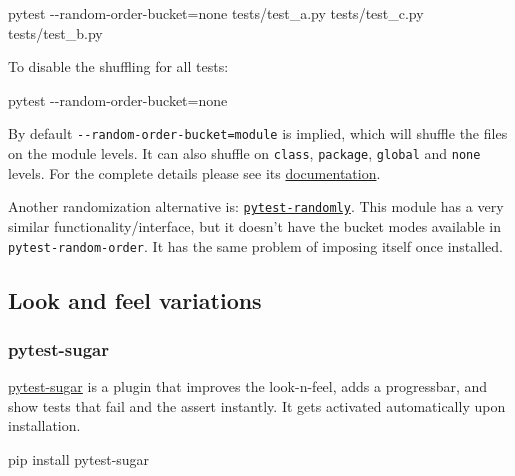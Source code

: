 \documentclass[
]{report}
\newenvironment{Shaded}{\begin{snugshade}}{\end{snugshade}}
\newcommand{\AttributeTok}[1]{\textcolor[rgb]{0.40,0.45,0.13}{#1}}
\newcommand{\ExtensionTok}[1]{\textcolor[rgb]{0.00,0.23,0.31}{#1}}
\newcommand{\NormalTok}[1]{\textcolor[rgb]{0.00,0.23,0.31}{#1}}
\newcommand{\OperatorTok}[1]{\textcolor[rgb]{0.37,0.37,0.37}{#1}}
\begin{document}
\begin{Shaded}
\begin{Highlighting}[]
\ExtensionTok{pytest} \AttributeTok{{-}{-}random{-}order{-}bucket}\OperatorTok{=}\NormalTok{none tests/test\_a.py tests/test\_c.py tests/test\_b.py}
\end{Highlighting}
\end{Shaded}

To disable the shuffling for all tests:

\begin{Shaded}
\begin{Highlighting}[]
\ExtensionTok{pytest} \AttributeTok{{-}{-}random{-}order{-}bucket}\OperatorTok{=}\NormalTok{none}
\end{Highlighting}
\end{Shaded}

By default \texttt{-\/-random-order-bucket=module} is implied, which
will shuffle the files on the module levels. It can also shuffle on
\texttt{class}, \texttt{package}, \texttt{global} and \texttt{none}
levels. For the complete details please see its
\href{https://github.com/jbasko/pytest-random-order}{documentation}.

Another randomization alternative is:
\href{https://github.com/pytest-dev/pytest-randomly}{\texttt{pytest-randomly}}.
This module has a very similar functionality/interface, but it doesn't
have the bucket modes available in \texttt{pytest-random-order}. It has
the same problem of imposing itself once installed.

\subsection{Look and feel variations}\label{look-and-feel-variations}

\subsubsection{pytest-sugar}\label{pytest-sugar}

\href{https://github.com/Frozenball/pytest-sugar}{pytest-sugar} is a
plugin that improves the look-n-feel, adds a progressbar, and show tests
that fail and the assert instantly. It gets activated automatically upon
installation.

\begin{Shaded}
\begin{Highlighting}[]
\ExtensionTok{pip}\NormalTok{ install pytest{-}sugar}
\end{Highlighting}
\end{Shaded}
\end{document}
